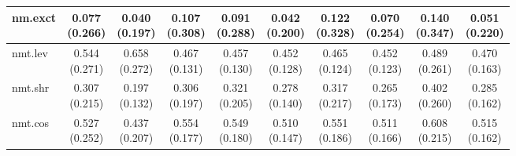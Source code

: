 \documentclass[epsfig,a4paper,11pt,titlepage,twoside,openany]{book}
\begin{document}
\begin{table}[H]
\begin{tabular}{l|c|c|c|c|c|c|c|c|c|}
\multicolumn{1}{|l|}{nm.exct}                          & \makecell{0.077 \\ (0.266)}  & \makecell{0.040 \\ (0.197)} & \makecell{0.107 \\ (0.308)} & \makecell{0.091 \\ (0.288)} & \makecell{0.042 \\ (0.200)} & \makecell{0.122 \\ (0.328)} & \makecell{0.070 \\ (0.254)} & \makecell{0.140 \\ (0.347)}    & \makecell{0.051 \\ (0.220)}   \\ \hline
\multicolumn{1}{|l|}{nmt.lev}            & \makecell{0.544 \\ (0.271)}  & \makecell{0.658 \\ (0.272)} & \makecell{0.467 \\ (0.131)} & \makecell{0.457 \\ (0.130)} & \makecell{0.452 \\ (0.128)} & \makecell{0.465 \\ (0.124)} & \makecell{0.452 \\ (0.123)} & \makecell{0.489 \\ (0.261)}    & \makecell{0.470 \\ (0.163)}   \\ \hline
\multicolumn{1}{|l|}{nmt.shr}                 & \makecell{0.307 \\ (0.215)}  & \makecell{0.197 \\ (0.132)} & \makecell{0.306 \\ (0.197)} & \makecell{0.321 \\ (0.205)} & \makecell{0.278 \\ (0.140)} & \makecell{0.317 \\ (0.217)} & \makecell{0.265 \\ (0.173)} & \makecell{0.402 \\ (0.260)}    & \makecell{0.285 \\ (0.162)}   \\ \hline
\multicolumn{1}{|l|}{nmt.cos} & \makecell{0.527 \\ (0.252)}  & \makecell{0.437 \\ (0.207)} & \makecell{0.554 \\ (0.177)} & \makecell{0.549 \\ (0.180)} & \makecell{0.510 \\ (0.147)} & \makecell{0.551 \\ (0.186)} & \makecell{0.511 \\ (0.166)} & \makecell{0.608 \\ (0.215)}    & \makecell{0.515 \\ (0.162)}   \\ \hline

\end{tabular}
\end{table}
\end{document}

